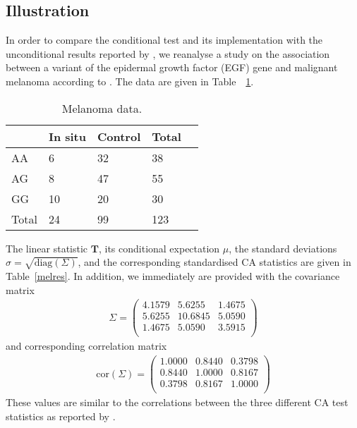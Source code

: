\documentclass[bimj,fleqn]{w-art}
\newcommand{\T}{\mathbf{T}}
\begin{document}
\subsection{Illustration}

In order to compare the conditional test and its implementation with the
unconditional results reported by \citet{Freidlin:2002}, we reanalyse a study on the association
between a variant of the epidermal growth factor 
(EGF) gene and malignant melanoma according to
\cite{Shahbazi:2002}. The data are given in Table~~\ref{mel}.


\begin{table}
\begin{center}
\caption{Melanoma data. \label{mel}}
\vspace*{0.5cm}
\begin{tabular}{l l l l l}
 &  In situ & Control & Total \\ \hline 
AA  &  6 & 32 & 38  \\ 
AG  &  8 & 47 & 55  \\ 
GG  &  10 & 20 & 30  \\ 
Total  &  24 & 99 & 123  \\ \hline
\end{tabular}
\end{center}
\end{table}



The linear statistic $\T$, its conditional expectation $\mu$,
the standard deviations $\sigma = \sqrt{\text{diag}(\Sigma)}$, and 
the corresponding standardised CA statistics are given in
Table~\ref{melres}. 
In addition, we immediately are provided with the covariance matrix
\begin{eqnarray*}
\Sigma = \left( \begin{array}{rrr} 
4.1579 & 5.6255 & 1.4675 \\ 
5.6255 & 10.6845 & 5.0590 \\ 
1.4675 & 5.0590 & 3.5915 \\ \end{array} \right)
\end{eqnarray*}
and corresponding correlation matrix
\begin{eqnarray*}
\text{cor}(\Sigma) = \left( \begin{array}{rrr} 
1.0000 & 0.8440 & 0.3798 \\ 
0.8440 & 1.0000 & 0.8167 \\ 
0.3798 & 0.8167 & 1.0000 \\ \end{array} \right)
\end{eqnarray*}
These values are similar to the correlations between the 
three different CA test statistics as reported by
\citet{Freidlin:2002}.
\end{document}
